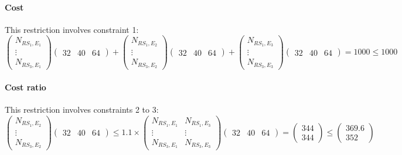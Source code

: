 \paragraph{Cost}
This restriction involves constraint 1:
\begin{equation}
    \begin{pmatrix}
        N_{RS_1,E_1}\\
        \vdots\\
        N_{RS_3,E_1}
    \end{pmatrix}
    \begin{pmatrix}
        32 & 40 & 64
    \end{pmatrix}
    +
    \begin{pmatrix}
        N_{RS_1,E_2}\\
        \vdots\\
        N_{RS_3,E_2}
    \end{pmatrix}
    \begin{pmatrix}
        32 & 40 & 64
    \end{pmatrix}
    +
    \begin{pmatrix}
        N_{RS_1,E_3}\\
        \vdots\\
        N_{RS_3,E_3}
    \end{pmatrix}
    \begin{pmatrix}
        32 & 40 & 64
    \end{pmatrix}
    =
    1000
    \leq
    1000
\end{equation}

\paragraph{Cost ratio}
This restriction involves constraints 2 to 3:
\begin{equation}
    \begin{pmatrix}
        N_{RS_1,E_2}\\
        \vdots\\
        N_{RS_3,E_2}
    \end{pmatrix}
    \begin{pmatrix}
        32 & 40 & 64
    \end{pmatrix}
    \leq
    1.1 
    \times
    \begin{pmatrix}
        N_{RS_1,E_1} & N_{RS_1,E_3}\\
        \vdots & \vdots\\
        N_{RS_3,E_1} & N_{RS_3,E_3}
    \end{pmatrix}
    \begin{pmatrix}
        32 & 40 & 64
    \end{pmatrix}
    =
    \begin{pmatrix}
        344\\
        344
    \end{pmatrix}
    \leq
    \begin{pmatrix}
        369.6\\
        352
    \end{pmatrix}
\end{equation}


